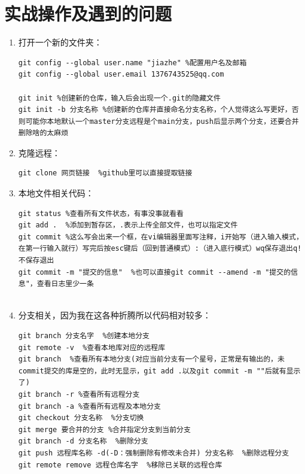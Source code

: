 \documentclass{article}
\begin{document}
\section{实战操作及遇到的问题}
\begin{enumerate}
\item 打开一个新的文件夹：
\begin{lstlisting}[breaklines=true]
git config --global user.name "jiazhe" %配置用户名及邮箱
git config --global user.email 1376743525@qq.com
	
git init %创建新的仓库，输入后会出现一个.git的隐藏文件
git init -b 分支名称 %创建新的仓库并直接命名分支名称，个人觉得这么写更好，否则可能你本地默认一个master分支远程是个main分支，push后显示两个分支，还要合并删除啥的太麻烦
\end{lstlisting}

\item 克隆远程：
\begin{lstlisting}[breaklines=true]
git clone 网页链接  %github里可以直接提取链接
\end{lstlisting}	
	
\item 本地文件相关代码：
\begin{lstlisting}[breaklines=true]
git status %查看所有文件状态，有事没事就看看
git add .  %添加到暂存区，.表示上传全部文件，也可以指定文件
git commit %这么写会出来一个框，在vi编辑器里面写注释，i开始写（进入输入模式，在第一行输入就行）写完后按esc键后（回到普通模式）:（进入底行模式）wq保存退出q!不保存退出
git commit -m "提交的信息"  %也可以直接git commit --amend -m "提交的信息"，查看日志里少一条
	
\end{lstlisting}	

\item 分支相关，因为我在这各种折腾所以代码相对较多：
\begin{lstlisting}[breaklines=true]
git branch 分支名字  %创建本地分支
git remote -v  %查看本地库对应的远程库
git branch  %查看所有本地分支(对应当前分支有一个星号，正常是有输出的，未commit提交的库是空的，此时无显示，git add .以及git commit -m ""后就有显示了)
git branch -r %查看所有远程分支
git branch -a %查看所有远程及本地分支
git checkout 分支名称  %分支切换
git merge 要合并的分支 %合并指定分支到当前分支
git branch -d 分支名称  %删除分支
git push 远程库名称 -d(-D：强制删除有修改未合并) 分支名称  %删除远程分支
git remote remove 远程仓库名字  %移除已关联的远程仓库
				
\end{lstlisting}


\end{enumerate}
\end{document}
